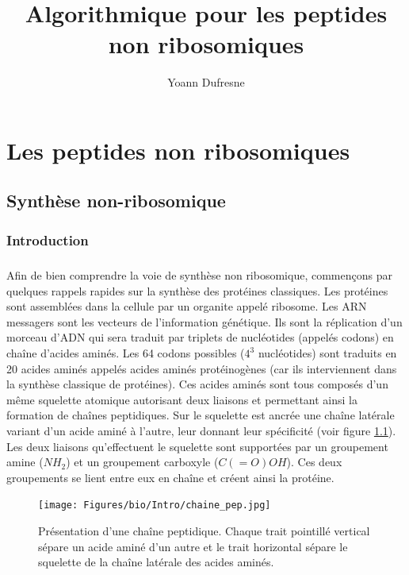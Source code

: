 \documentclass[12pt,french,twoside]{report}
\title{Algorithmique pour les peptides non ribosomiques}
\author{Yoann Dufresne}
\begin{document}
\maketitle
\tableofcontents

\chapter{Les peptides non ribosomiques}

\section{Synthèse non-ribosomique}

\subsection{Introduction}

\paragraph{}Afin de bien comprendre la voie de synthèse non ribosomique, commençons par quelques rappels rapides sur la synthèse des protéines classiques.
Les protéines sont assemblées dans la cellule par un organite appelé ribosome.
Les ARN messagers sont les vecteurs de l'information génétique.
Ils sont la réplication d'un morceau d'ADN qui sera traduit par triplets de nucléotides (appelés codons) en chaîne d'acides aminés.
Les 64 codons possibles ($4^3$ nucléotides) sont traduits en 20 acides aminés appelés acides aminés protéinogènes (car ils interviennent dans la synthèse classique de protéines).
Ces acides aminés sont tous composés d'un même squelette atomique autorisant deux liaisons et permettant ainsi la formation de chaînes peptidiques.
Sur le squelette est ancrée une chaîne latérale variant d'un acide aminé à l'autre, leur donnant leur spécificité (voir figure \ref{chaine_pep}).
Les deux liaisons qu'effectuent le squelette sont supportées par un groupement amine ($NH_2$) et un groupement carboxyle ($C(=O)OH$).
Ces deux groupements se lient entre eux en chaîne et créent ainsi la protéine.

\begin{figure}[h!]
  \begin{center}
    \texttt{[image: Figures/bio/Intro/chaine\_pep.jpg]}
    \caption{\label{chaine_pep}Présentation d'une chaîne peptidique.
    Chaque trait pointillé vertical sépare un acide aminé d'un autre et le trait horizontal sépare le squelette de la chaîne latérale des acides aminés.}
  \end{center}
\end{figure}
\end{document}
